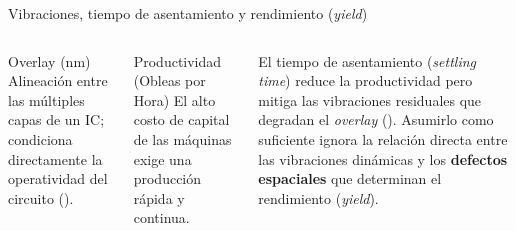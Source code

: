 \documentclass[en,16:9,navbarinline,bigfoot]{sdqbeamer}
\begin{document}
\begin{frame}{Vibraciones, tiempo de asentamiento y rendimiento (\textit{yield})}
    \begin{columns}
        \begin{blueblock}{Overlay (nm)}
            Alineación entre las múltiples capas de un IC; condiciona directamente la operatividad del circuito (\cite{Schmidt2012_UltraPrecision}).
        \end{blueblock}

        \begin{greenblock}{Productividad (Obleas por Hora)}
            El alto costo de capital de las máquinas exige una producción rápida y continua.
        \end{greenblock}

        \vspace{0.2cm}
        El tiempo de asentamiento (\textit{settling time}) reduce la productividad pero mitiga las vibraciones residuales que degradan el \textit{overlay} (\cite{Butler2011_PositionControl}). Asumirlo como suficiente ignora la relación directa entre las vibraciones dinámicas y los \textbf{defectos espaciales} que determinan el rendimiento (\textit{yield}).


\end{columns}
\end{frame}
\end{document}
